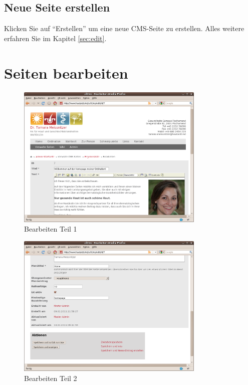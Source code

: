 \documentclass[article, a4paper, oneside, 11pt]{memoir}
\begin{document}
\subsection{Neue Seite erstellen}

Klicken Sie auf "`Erstellen"' um eine neue CMS-Seite zu erstellen. Alles weitere erfahren Sie im Kapitel \vref{sec:edit}.


\section{Seiten bearbeiten}
\label{sec:edit}

\begin{figure}[htp]
\centering
\includegraphics[width=0.8\textwidth]{edit1}
\caption{Bearbeiten Teil 1}
\label{fig:edit1}
\end{figure}

\begin{figure}[htp]
\centering
\includegraphics[width=0.8\textwidth]{edit2}
\caption{Bearbeiten Teil 2}
\label{fig:edit2}
\end{figure}
\end{document}
